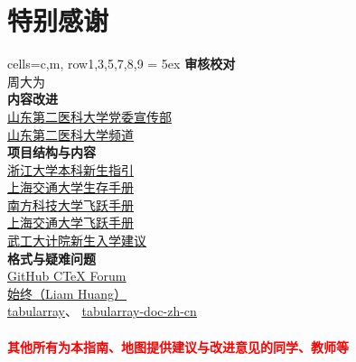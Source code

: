 \chapter*{特别感谢}
\begin{tblr}[
    long,
    theme=no-caption
    ]{
    cells={c,m},
    row{1,3,5,7,8,9} = {5ex}
        }
    {\large\textbf{审核校对}}                                                             \\
    {周大为}                                                                              \\
    {\large\textbf{内容改进}}                                                             \\
    {
    \uline{\href{https://xchb.sdsmu.edu.cn/}{山东第二医科大学党委宣传部}}                 \\
    \uline{\href{https://pd.qq.com/s/7mekdr5ve}{山东第二医科大学频道}}
    }                                                                                     \\
    {\large\textbf{项目结构与内容}}                                                       \\
    {
    \uline{\href{https://zjuers.com/welcome/}{浙江大学本科新生指引}}                      \\
    \uline{\href{https://survivesjtu.gitbook.io/survivesjtumanual}{上海交通大学生存手册}} \\
    \uline{\href{https://sustech-application.com/}{南方科技大学飞跃手册}}                 \\
    \uline{\href{https://survivesjtu.github.io/SJTU-Application/}{上海交通大学飞跃手册}}  \\
    \uline{\href{https://gitee.com/hanyaner/witjij}{武工大计院新生入学建议}}
    }                                                                                     \\
    {\large\textbf{格式与疑难问题}}                                                       \\
    {
    \uline{\href{https://github.com/CTeX-org/forum/issues}{GitHub CTeX Forum}}            \\
    \uline{\href{https://liam.page}{始终（Liam Huang）}}                                  \\
    \uline{\href{https://github.com/lvjr/tabularray}{tabularray}}、%
    \uline{\href{https://gitee.com/nwafu_nan/tabularray-doc-zh-cn}{tabularray-doc-zh-cn}}
    }                                                                                     \\
    \\
    {\large\textbf{\textcolor{red}{其他所有为本指南、地图提供建议与改进意见的同学、教师等}}}
\end{tblr}

